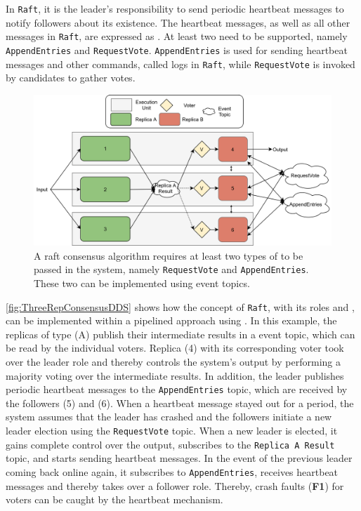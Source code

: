 In \texttt{Raft}, it is the leader's responsibility to send periodic heartbeat messages to notify followers about its existence.
The heartbeat messages, as well as all other messages in \texttt{Raft}, are expressed as .
At least two  need to be supported, namely \texttt{AppendEntries} and \texttt{RequestVote}.
\texttt{AppendEntries} is used for sending heartbeat messages and other commands, called logs in \texttt{Raft}, while \texttt{RequestVote} is invoked by candidates to gather votes.

\begin{figure}[!hb]
	\centering
	\includegraphics[width=0.9\linewidth]{images/ThreeEUConsensusDDS}
	\caption{A raft consensus algorithm requires at least two types of  to be passed in the system, namely \texttt{RequestVote} and \texttt{AppendEntries}. These two can be implemented using  event topics.}
	\label{fig:ThreeRepConsensusDDS}
\end{figure}

\autoref{fig:ThreeRepConsensusDDS} shows how the concept of \texttt{Raft}, with its roles and , can be implemented within a pipelined approach using .
In this example, the replicas of type (A) publish their intermediate results in a  event topic, which can be read by the individual voters.
Replica (4) with its corresponding voter took over the leader role and thereby controls the system's output by performing a majority voting over the intermediate results.
In addition, the leader publishes periodic heartbeat messages to the \texttt{AppendEntries} topic, which are received by the followers (5) and (6).
When a heartbeat message stayed out for a period, the system assumes that the leader has crashed and the followers initiate a new leader election using the \texttt{RequestVote} topic.
When a new leader is elected, it gains complete control over the output, subscribes to the \texttt{Replica A Result} topic, and starts sending heartbeat messages.
In the event of the previous leader coming back online again, it subscribes to \texttt{AppendEntries}, receives heartbeat messages and thereby takes over a follower role.
Thereby, crash faults (\textbf{F1}) for voters can be caught by the heartbeat mechanism.

